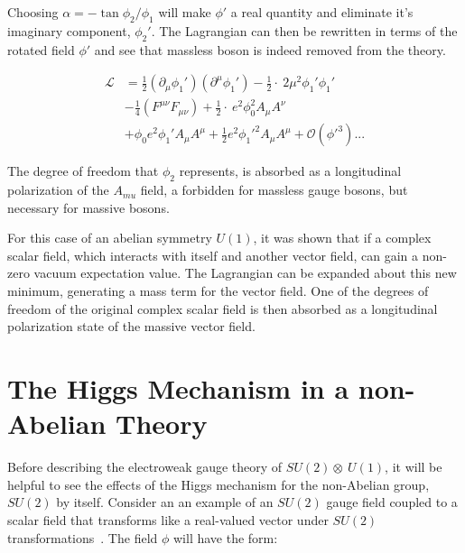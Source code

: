 \noindent Choosing $\alpha = -\tan{\phi_{2}/\phi_{1}}$ will make $\phi'$
 a real quantity and eliminate it's imaginary component, $\phi_{2}'$.
 The Lagrangian can then be rewritten in terms of the rotated field
 $\phi'$ and see that massless boson is indeed removed from the
 theory.

\begin{equation}\label{eq:abelian_higgs_mechanism_final_lagrangian}
\begin{aligned}
\mathcal{L} & =
\frac{1}{2}(\partial_{\mu}\phi_{1}')(\partial^{\mu}\phi_{1}') -
\frac{1}{2}\cdot~2\mu^{2}\phi_{1}'\phi_{1}' \\
&  -\frac{1}{4}(F^{\mu\nu}F_{\mu\nu}) +
\frac{1}{2}\cdot~e^{2}\phi_{0}^{2}A_{\mu}A^{\nu} \\
&  + \phi_{0}e^{2}\phi_{1}'A_{\mu}A^{\mu} +
\frac{1}{2}e^2\phi_{1}'^{2}A_{\mu}A^{\mu} + \mathcal{O}(\phi'^{3})...
\end{aligned}
\end{equation}

\par The degree of freedom that $\phi_{2}$ represents, is absorbed as
a longitudinal polarization of the $A_{mu}$ field, a forbidden for
massless gauge bosons, but necessary for massive bosons.  

\par For this case of an abelian symmetry $U(1)$, it was shown that if a
complex scalar field, which interacts with itself and another vector
field, can gain a non-zero vacuum expectation value.  The Lagrangian can
be expanded about this new minimum, generating a mass term for the
vector field.  One of the degrees of freedom of the original complex
scalar field is then absorbed as a longitudinal polarization state of
the massive vector field.  

\section{The Higgs Mechanism in a non-Abelian Theory}
\label{non_abelian_higgs_mechanism_overview}

\par Before describing the electroweak gauge theory of
$SU(2)\otimes~U(1)$, it will be helpful to see the effects of the
Higgs mechanism for the non-Abelian group, $SU(2)$ by itself.  Consider an
an example of an $SU(2)$ gauge field coupled to a scalar field that
transforms like a real-valued vector under $SU(2)$
transformations~\cite{Peskin_Schroeder}.  The field $\phi$ will have
the form:

